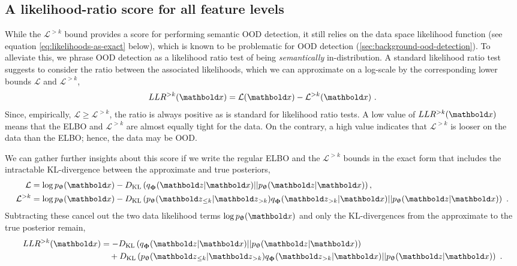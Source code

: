 \subsection{A likelihood-ratio score for all feature levels}
While the $\mathcal{L}^{>k}$ bound provides a score for performing semantic OOD detection, it still relies on the data space likelihood function (see equation \eqref{eq:likelihoods-as-exact} below), which is known to be problematic for OOD detection (\cref{sec:background-ood-detection}). To alleviate this, we phrase OOD detection as a likelihood ratio test of being \emph{semantically} in-distribution.
A standard likelihood ratio test \parencite{buse_likelihood_1982} suggests to consider the ratio between the associated likelihoods, which we can approximate on a log-scale by the corresponding lower bounds $\mathcal{L}$ and $\mathcal{L}^{>k}$,
\begin{equation}\label{eq:llr-as-difference-in-likelihoods}
    LLR^{>k}(\xb) = \mathcal{L}(\xb) - \mathcal{L}^{>k}(\xb) \ .
\end{equation}
Since, empirically, $\mathcal{L}\geq\mathcal{L}^{>k}$, the ratio is always positive as is standard for likelihood ratio tests.
A low value of $LLR^{>k}(\xb)$ means that the ELBO and $\mathcal{L}^{>k}$ are almost equally tight for the data.
On the contrary, a high value indicates that $\mathcal{L}^{>k}$ is looser on the data than the ELBO; hence, the data may be OOD.


We can gather further insights about this score if we write the regular ELBO and the $\mathcal{L}^{>k}$ bounds in the exact form that includes the intractable KL-divergence between the approximate and true posteriors,
\begin{align}
    \mathcal{L}      &= \log p_\thetab(\xb) - D_{\mathrm{KL}}\left( q_\phib(\zb|\xb) || p_\thetab(\zb|\xb)\right), \label{eq:likelihoods-as-exact} \\ 
    \mathcal{L}^{>k} &= \log p_\thetab(\xb) - D_{\mathrm{KL}}\left( p_\thetab(\zb_{\leq k }|\zb_{>k}) q_\phib(\zb_{>k}|\xb) || p_\thetab(\zb|\xb)\right) \nonumber \ .
\end{align}
Subtracting these cancel out the two data likelihood terms $\log p_\thetab(\xb)$ and only the KL-divergences from the approximate to the true posterior remain,
\begin{align}
    LLR^{>k}(\xb) &= - D_{\mathrm{KL}}\left( q_\phib(\zb|\xb) || p_\thetab(\zb|\xb)\right) \\
                 &\quad + D_{\mathrm{KL}}\left( p_\thetab(\zb_{\leq k}|\zb_{>k}) q_\phib(\zb_{>k}|\xb) || p_\thetab(\zb|\xb)\right) \ . \notag
\end{align}\label{eq:llr-as-kls}

